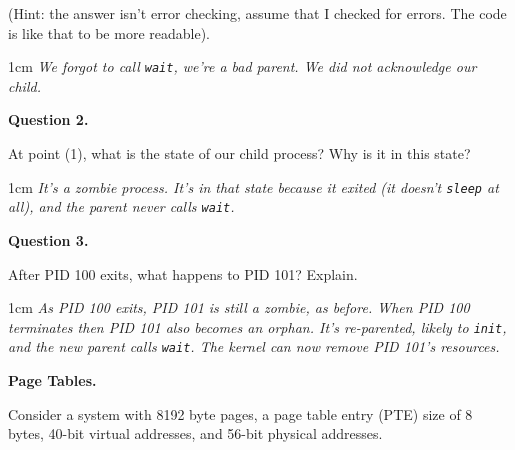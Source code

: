 \documentclass[12pt]{article}
\newenvironment{answer}{\begin{adjustwidth}{1cm}{}\itshape}{\end{adjustwidth}}
\begin{document}
\vspace{1em}

(Hint: the answer isn't error checking, assume that I checked for errors. The
code is like that to be more readable).

\vspace{1em}

\begin{answer}
  We forgot to call \texttt{wait}, we're a bad parent. We did not acknowledge
  our child.
\end{answer}

\vspace{1em}

\textbf{Question 2.}

\vspace{1em}

At point (1), what is the state of our child process? Why is it in this state?

\vspace{1em}

\begin{answer}
  It's a zombie process. It's in that state because it exited (it doesn't
  \texttt{sleep} at all), and the parent never calls \texttt{wait}.
\end{answer}

\vspace{1em}

\textbf{Question 3.}

\vspace{1em}

After PID 100 exits, what happens to PID 101? Explain.

\vspace{1em}

\begin{answer}
  As PID 100 exits, PID 101 is still a zombie, as before. When PID 100
  terminates then PID 101 also becomes an orphan. It's re-parented, likely
  to \texttt{init}, and the new parent calls \texttt{wait}. The kernel can now
  remove PID 101's resources.
\end{answer}

\newpage

\textbf{Page Tables.}

\vspace{1em}

Consider a system with 8192 byte pages, a page table entry (PTE) size of 8
bytes, 40-bit virtual addresses, and 56-bit physical addresses.

\vspace{1em}
\end{document}
